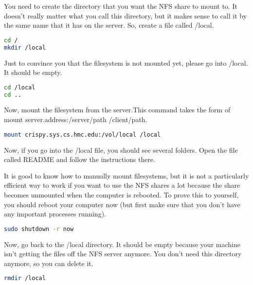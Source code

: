 \documentclass[11pt]{article}
\begin{document}
		You need to create the directory that you want the NFS share to mount to. It doesn't really matter what you call this directory, but it makes sense to call it by the same name that it has on the server. So, create a file called /local.

\begin{lstlisting}[basicstyle=\ttfamily, backgroundcolor = \color{lightgray}, language = bash, xleftmargin = 0cm, framexleftmargin = 1em]
cd /
mkdir /local
\end{lstlisting} 	

Just to convince you that the filesystem is not mounted yet, please go into /local. It should be empty.
\begin{lstlisting}[basicstyle=\ttfamily, backgroundcolor = \color{lightgray}, language = bash, xleftmargin = 0cm, framexleftmargin = 1em]
cd /local
cd ..
\end{lstlisting} 	

Now, mount the filesystem from the server.This command takes the form of mount server.address:/server/path /client/path.
\begin{lstlisting}[basicstyle=\ttfamily, backgroundcolor = \color{lightgray}, language = bash, xleftmargin = 0cm, framexleftmargin = 1em]
mount crispy.sys.cs.hmc.edu:/vol/local /local
\end{lstlisting} 	

Now, if you go into the /local file, you should see several folders. Open the file called README and follow the instructions there.

It is good to know how to manually mount filesystems, but it is not a particularly efficient way to work if you want to use the NFS shares a lot because the share becomes unmounted when the computer is rebooted. To prove this to yourself, you should reboot your computer now (but first make sure that you don't have any important processes running). 

\begin{lstlisting}[basicstyle=\ttfamily, backgroundcolor = \color{lightgray}, language = bash, xleftmargin = 0cm, framexleftmargin = 1em]
sudo shutdown -r now
\end{lstlisting} 	

Now, go back to the /local directory. It should be empty because your machine isn't getting the files off the NFS server anymore. You don't need this directory anymore, so you can delete it.

\begin{lstlisting}[basicstyle=\ttfamily, backgroundcolor = \color{lightgray}, language = bash, xleftmargin = 0cm, framexleftmargin = 1em]
rmdir /local
\end{lstlisting} 	
	
\end{document}
